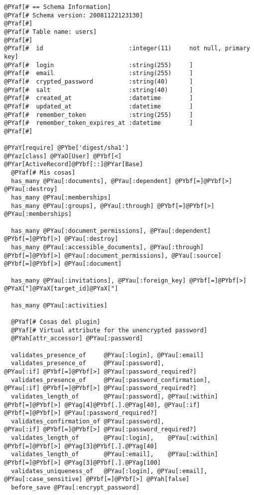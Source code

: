\begin{Verbatim}[commandchars=@\[\]]
@PYaf[# == Schema Information]
@PYaf[# Schema version: 20081122123130]
@PYaf[#]
@PYaf[# Table name: users]
@PYaf[#]
@PYaf[#  id                        :integer(11)     not null, primary key]
@PYaf[#  login                     :string(255)     ]
@PYaf[#  email                     :string(255)     ]
@PYaf[#  crypted_password          :string(40)      ]
@PYaf[#  salt                      :string(40)      ]
@PYaf[#  created_at                :datetime        ]
@PYaf[#  updated_at                :datetime        ]
@PYaf[#  remember_token            :string(255)     ]
@PYaf[#  remember_token_expires_at :datetime        ]
@PYaf[#]

@PYaY[require] @PYbe['digest/sha1']
@PYaz[class] @PYaO[User] @PYbf[<] @PYar[ActiveRecord]@PYbf[::]@PYar[Base]
  @PYaf[# Mis cosas]
  has_many @PYau[:documents], @PYau[:dependent] @PYbf[=]@PYbf[>] @PYau[:destroy]
  has_many @PYau[:memberships]
  has_many @PYau[:groups], @PYau[:through] @PYbf[=]@PYbf[>] @PYau[:memberships]
  
  has_many @PYau[:document_permissions], @PYau[:dependent] @PYbf[=]@PYbf[>] @PYau[:destroy]
  has_many @PYau[:accessible_documents], @PYau[:through] @PYbf[=]@PYbf[>] @PYau[:document_permissions], @PYau[:source] @PYbf[=]@PYbf[>] @PYau[:document]
  
  has_many @PYau[:invitations], @PYau[:foreign_key] @PYbf[=]@PYbf[>] @PYaX["]@PYaX[target_id]@PYaX["]
  
  has_many @PYau[:activities]
  
  @PYaf[# Cosas del plugin]
  @PYaf[# Virtual attribute for the unencrypted password]
  @PYah[attr_accessor] @PYau[:password]

  validates_presence_of     @PYau[:login], @PYau[:email]
  validates_presence_of     @PYau[:password],                   @PYau[:if] @PYbf[=]@PYbf[>] @PYau[:password_required?]
  validates_presence_of     @PYau[:password_confirmation],      @PYau[:if] @PYbf[=]@PYbf[>] @PYau[:password_required?]
  validates_length_of       @PYau[:password], @PYau[:within] @PYbf[=]@PYbf[>] @PYag[4]@PYbf[.].@PYag[40], @PYau[:if] @PYbf[=]@PYbf[>] @PYau[:password_required?]
  validates_confirmation_of @PYau[:password],                   @PYau[:if] @PYbf[=]@PYbf[>] @PYau[:password_required?]
  validates_length_of       @PYau[:login],    @PYau[:within] @PYbf[=]@PYbf[>] @PYag[3]@PYbf[.].@PYag[40]
  validates_length_of       @PYau[:email],    @PYau[:within] @PYbf[=]@PYbf[>] @PYag[3]@PYbf[.].@PYag[100]
  validates_uniqueness_of   @PYau[:login], @PYau[:email], @PYau[:case_sensitive] @PYbf[=]@PYbf[>] @PYah[false]
  before_save @PYau[:encrypt_password]
  

\end{Verbatim}
